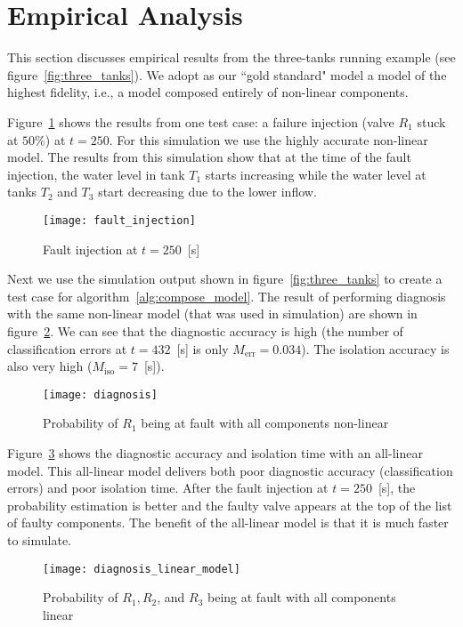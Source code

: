 \section{Empirical Analysis}
%
This section discusses empirical results from the three-tanks
running example (see figure~\ref{fig:three_tanks}). 
We adopt as our ``gold standard" model a model of the highest fidelity,
i.e., a model composed entirely of non-linear components.

Figure~\ref{fig:fault_injection} shows
the results from one test case: a failure injection (valve $R_1$ stuck
at $50$\%) at $t = 250$. For this simulation we use the highly
accurate non-linear model. The results from this simulation show that
at the time of the fault injection, the water level in tank $T_1$
starts increasing while the water level at tanks $T_2$ and $T_3$ start
decreasing due to the lower inflow.
%
\begin{figure}[htb]
  \centering
  \texttt{[image: fault\_injection]}
  \caption{Fault injection at $t = 250$~[s]}
  \label{fig:fault_injection}
\end{figure}
\par
%
Next we use the simulation output shown in figure~\ref{fig:three_tanks} to
create a test case for algorithm~\ref{alg:compose_model}. The result
of performing diagnosis with the same non-linear model (that was used in
simulation) are shown in figure~\ref{fig:diagnosis1}. We can see that
the diagnostic accuracy is high (the number of classification errors
at $t = 432$~[s] is only $M_{\mathrm{err}} = 0.034$). The isolation
accuracy is also very high ($M_{\mathrm{iso}} = 7$~[s]).
%
\begin{figure}[htb]
  \centering
  \texttt{[image: diagnosis]}
  \caption{Probability of $R_1$ being at fault with all components non-linear}
  \label{fig:diagnosis1}
\end{figure}
\par
%
Figure~\ref{fig:diagnosis_linear_model} shows the diagnostic accuracy
and isolation time with an all-linear model. This all-linear model
delivers both poor diagnostic accuracy (classification errors) and poor
isolation time. After the fault injection at $t = 250$~[s], the
probability estimation is better and the faulty valve appears
at the top of the list of faulty components. The benefit of the
all-linear model is that it is much faster to simulate.
%
\begin{figure}[htb]
  \centering
  \texttt{[image: diagnosis\_linear\_model]}
  \caption{Probability of $R_1, R_2$, and $R_3$ being at fault with all components linear}
  \label{fig:diagnosis_linear_model}
\end{figure}
